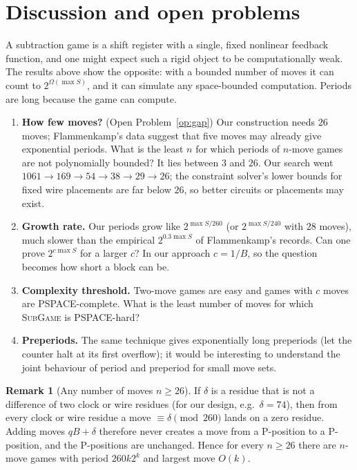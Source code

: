 \documentclass[11pt]{article}
\theoremstyle{definition}
\newtheorem{remark}[theorem]{Remark}
\newcommand{\nmoves}{26}
\begin{document}
\section{Discussion and open problems}

A subtraction game is a shift register with a single, fixed nonlinear feedback function, and one
might expect such a rigid object to be computationally weak.  The results above show the opposite:
with a bounded number of moves it can count to $2^{\Omega(\max S)}$, and it can simulate any
space-bounded computation.  Periods are long because the game can compute.

\begin{enumerate}[leftmargin=*]
\item \textbf{How few moves?} (Open Problem~\ref{op:gap})  Our construction needs $\nmoves$ moves;
Flammenkamp's data suggest that five moves may already give exponential periods.  What is the least
$n$ for which periods of $n$-move games are not polynomially bounded?  It lies between $3$ and $26$.  Our search went $1061\to169\to54\to38\to29\to\nmoves$; the
constraint solver's lower bounds for fixed wire placements are far below $\nmoves$, so better
circuits or placements may exist.
\item \textbf{Growth rate.}  Our periods grow like $2^{\max S/260}$ (or $2^{\max S/240}$ with $28$ moves),
much slower than the empirical $2^{0.3\max S}$ of Flammenkamp's records.  Can one prove $2^{c\max S}$ for a larger $c$?  In our
approach $c=1/B$, so the question becomes how short a block can be.
\item \textbf{Complexity threshold.}  Two-move games are easy and games with $c$ moves are
PSPACE-complete.  What is the least number of moves for which \textsc{SubGame} is PSPACE-hard?
\item \textbf{Preperiods.}  The same technique gives exponentially long preperiods (let the counter
halt at its first overflow); it would be interesting to understand the joint behaviour of period and
preperiod for small move sets.
\end{enumerate}

\begin{remark}[Any number of moves $n\ge\nmoves$]\label{rem:pad}
If $\delta$ is a residue that is not a difference of two clock or wire residues (for our design,
e.g.\ $\delta=74$), then from every clock or wire residue a move $\equiv\delta\pmod{260}$ lands on a zero
residue.  Adding moves $qB+\delta$ therefore never creates a
move from a P-position to a P-position, and the P-positions are unchanged.  Hence for every
$n\ge\nmoves$ there are $n$-move games with period $260k2^k$ and largest move $O(k)$.
\end{remark}
\end{document}

